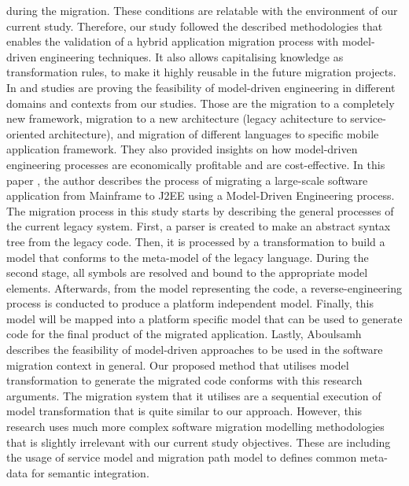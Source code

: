 \documentclass[conference]{IEEEtran}
\begin{document}
during the migration. These conditions are relatable with the environment of our current study.
Therefore, our study followed the described methodologies that enables the validation of a
hybrid application migration process with model-driven engineering techniques. It also allows
capitalising knowledge as transformation rules, to make it highly reusable in the future migration projects.
\newline
In \cite{b9} and \cite{b10} studies are proving the feasibility of model-driven engineering
in different domains and contexts from our studies. Those are the migration to a completely new framework,
migration to a new architecture (legacy achitecture to service-oriented architecture), and migration
of different languages to specific mobile application framework.
They also provided insights on how model-driven engineering processes are economically
profitable and are cost-effective.
\newline
In this paper \cite{b9}, the author describes the process of migrating a large-scale software application from Mainframe to J2EE
using a Model-Driven Engineering process. The migration process in this study starts by describing the general
processes of the current legacy system.
First, a parser is created to make an abstract syntax tree from the legacy code. Then, it is processed
by a transformation to build a model that conforms to the meta-model of the legacy language.
During the second stage, all symbols are resolved and bound to the appropriate model elements.
Afterwards, from the model representing the code, a reverse-engineering process is conducted to produce a platform independent
model. Finally, this model will be mapped into a platform specific model that can be used to generate code
for the final product of the migrated application.
\newline
Lastly, Aboulsamh describes \cite{b10} the feasibility of model-driven approaches to be used in the software migration context in general.
Our proposed method that utilises model transformation to generate the migrated code conforms with this
research arguments. The migration system that it utilises are a sequential execution of model transformation \cite{b10}
that is quite similar to our approach.
However, this research uses much more complex software migration modelling
methodologies that is slightly irrelevant with our current study objectives. These are including
the usage of service model and migration path model to defines common meta-data for semantic integration.
\end{document}
